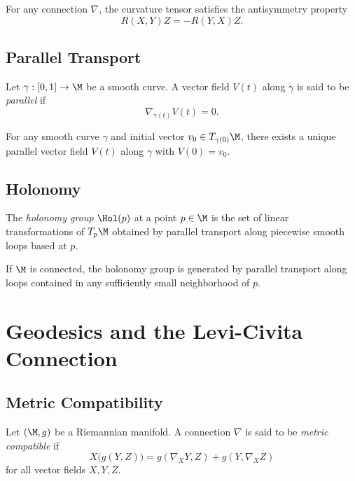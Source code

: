 \begin{lemma}
For any connection $\nabla$, the curvature tensor satisfies the
antisymmetry property
\[
R(X,Y)Z = -R(Y,X)Z.
\]
\end{lemma}

\subsection{Parallel Transport}

\begin{definition}
Let $\gamma : [0,1] \to \M$ be a smooth curve.  
A vector field $V(t)$ along $\gamma$ is said to be \emph{parallel} if
\[
\nabla_{\dot{\gamma}(t)} V(t) = 0.
\]
\end{definition}

\begin{theorem}
For any smooth curve $\gamma$ and initial vector $v_0 \in T_{\gamma(0)}\M$,
there exists a unique parallel vector field $V(t)$ along $\gamma$ with
$V(0) = v_0$.
\end{theorem}

\subsection{Holonomy}

\begin{definition}
The \emph{holonomy group} $\Hol(p)$ at a point $p \in \M$ is the set of
linear transformations of $T_p\M$ obtained by parallel transport along
piecewise smooth loops based at $p$.
\end{definition}

\begin{lemma}
If $\M$ is connected, the holonomy group is generated by parallel
transport along loops contained in any sufficiently small neighborhood
of $p$.
\end{lemma}

\section{Geodesics and the Levi-Civita Connection}

\subsection{Metric Compatibility}

\begin{definition}
Let $(\M,g)$ be a Riemannian manifold.  
A connection $\nabla$ is said to be \emph{metric compatible} if
\[
X\big(g(Y,Z)\big)
= g(\nabla_X Y, Z) + g(Y, \nabla_X Z)
\]
for all vector fields $X,Y,Z$.
\end{definition}

